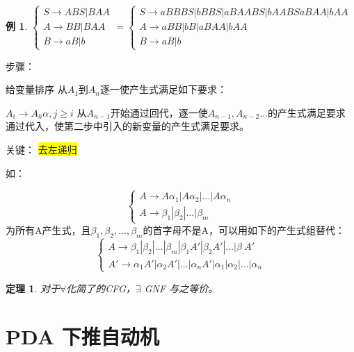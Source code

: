 \documentclass{ctexart}
\newcommand{\hl}[1]{\colorbox{yellow}{#1}}
\newtheorem{example}{例}[section]
\newtheorem{theorem}{定理}[section]
\begin{document}
\begin{example}
    $
        \begin{cases}
            S \to ABS | BAA \\
            A \to BB | BAA \\
            B \to aB | b
        \end{cases} = \begin{cases}
            S \to aBBBS | bBBS | aBAABS | bAABS 
                    aBAA | bAA\\
            A \to aBB | bB | aBAA | bAA \\
            B \to aB | b
        \end{cases}
    $
\end{example}

步骤：
\begin{outline}[enumerate]
    \1 给变量排序
    \1 从$A_1$到$A_n$逐一使产生式满足如下要求：

    $A_i \to A_h \alpha, j \ge i$
    \1 从$A_{n-1}$开始通过回代，逐一使$A_{n-1},A_{n-2}\dots$的产生式满足要求
    \1 通过代入，使第二步中引入的新变量的产生式满足要求。

    关键： \hl{去左递归}

    如：

    $$
    \begin{cases}
        A \to A\alpha_1 | A\alpha_2 | \dots | A\alpha_n \\
        A \to \beta_1 | \beta_2 | \dots | \beta_m
    \end{cases}
    $$
    为所有A产生式，且$\beta_1, \beta_2, \dots, \beta_m$的首字母不是A，可以用如下的产生式组替代：
    $$
    \begin{cases}
        A \to \beta_1 | \beta_2 | \dots | \beta_m | \beta_1 A' | \beta_2 A' | \dots | \beta_, A' \\
        A' \to \alpha_1 A' | \alpha_2 A' | \dots | \alpha_n A' | \alpha_1 | \alpha_2 | \dots | \alpha_n
    \end{cases}
    $$
\end{outline}
\begin{theorem}
    对于$\forall$化简了的CFG，$\exists$ GNF 与之等价。
\end{theorem}

\section{PDA 下推自动机}
\end{document}
